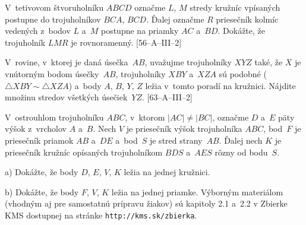 {\D
V~tetivovom štvoruholníku $ABCD$ označme $L$, $M$ stredy kružníc
vpísaných postupne do trojuholníkov $BCA$, $BCD$. Ďalej označme $R$
priesečník kolmíc vedených z~bodov $L$ a~$M$ postupne na priamky $AC$
a~$BD$. Dokážte, že trojuholník $LMR$ je rovnoramenný.
[56--A--III--2]

V~rovine, v~ktorej je daná úsečka~$AB$, uvažujme trojuholníky $XYZ$
také, že $X$ je vnútorným bodom úsečky~$AB$, trojuholníky $XBY$ a~$XZA$
sú podobné ($\triangle XBY\sim\triangle XZA$)
a~body $A$, $B$, $Y$, $Z$ ležia v~tomto poradí na
kružnici. Nájdite množinu stredov všetkých úsečiek~$YZ$.
[63--A--III--2]

V~ostrouhlom trojuholníku $ABC$, v~ktorom $|AC|\ne|BC|$, označme $D$ a~$E$ päty výšok z~vrcholov $A$ a~$B$. Nech $V$ je priesečník výšok trojuholníka $ABC$, bod~$F$ je priesečník priamok $AB$ a~$DE$ a~bod~$S$ je stred strany~$AB$. Ďalej nech $K$ je priesečník kružníc opísaných trojuholníkom $BDS$ a~$AES$ rôzny od bodu~$S$.
\item{a)} Dokážte, že body $D$, $E$, $V$, $K$ ležia na jednej kružnici.
\item{b)} Dokážte, že body $F$, $V$, $K$ ležia na jednej priamke.
\endgraf\indent
[57--A--III--2]
\medskip\everypar{}
Výborným materiálom (vhodným aj pre samostatnú prípravu žiakov) sú
kapitoly 2.1 a~2.2 v Zbierke KMS dostupnej na stránke {\tt http://kms.sk/zbierka}.

}


